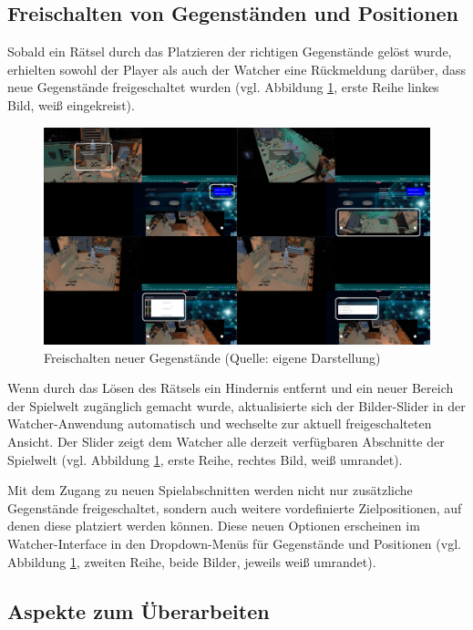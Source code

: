 \subsection{Freischalten von Gegenständen und Positionen}

Sobald ein Rätsel durch das Platzieren der richtigen Gegenstände gelöst wurde, erhielten sowohl der Player als auch der Watcher eine Rückmeldung darüber, dass neue Gegenstände freigeschaltet wurden (vgl. Abbildung \ref{fig:old-unlock-system}, erste Reihe linkes Bild, weiß eingekreist). 

\begin{figure}[ht]
\centering
\includegraphics[width=1\linewidth]{content/pictures/UnlockMore.png}
\caption{Freischalten neuer Gegenstände (Quelle: eigene Darstellung)}
\label{fig:old-unlock-system}
\end{figure}

Wenn durch das Lösen des Rätsels ein Hindernis entfernt und ein neuer Bereich der Spielwelt zugänglich gemacht wurde, aktualisierte sich der Bilder-Slider in der Watcher-Anwendung automatisch und wechselte zur aktuell freigeschalteten Ansicht. Der Slider zeigt dem Watcher alle derzeit verfügbaren Abschnitte der Spielwelt  (vgl. Abbildung \ref{fig:old-unlock-system}, erste Reihe, rechtes Bild, weiß umrandet). 

Mit dem Zugang zu neuen Spielabschnitten werden nicht nur zusätzliche Gegenstände freigeschaltet, sondern auch weitere vordefinierte Zielpositionen, auf denen diese platziert werden können. Diese neuen Optionen erscheinen im Watcher-Interface in den Dropdown-Menüs für Gegenstände und Positionen (vgl. Abbildung \ref{fig:old-unlock-system}, zweiten Reihe, beide Bilder, jeweils weiß umrandet). 

\subsection{Aspekte zum Überarbeiten}

